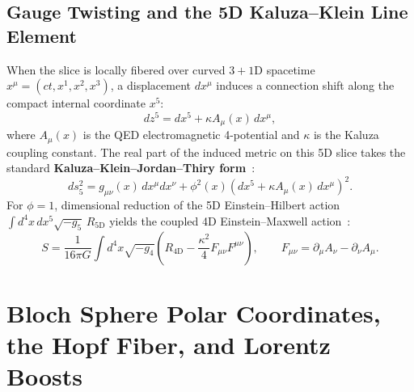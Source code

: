 \documentclass[11pt,a4paper]{article}
\begin{document}
\subsection{Gauge Twisting and the 5D Kaluza--Klein Line Element}
When the slice is locally fibered over curved $3+1\text{D}$ spacetime $x^\mu = (ct, x^1, x^2, x^3)$, a displacement $dx^\mu$ induces a connection shift along the compact internal coordinate $x^5$:
\begin{equation}
dz^5 = dx^5 + \kappa A_\mu(x)\, dx^\mu,
\end{equation}
where $A_\mu(x)$ is the QED electromagnetic 4-potential and $\kappa$ is the Kaluza coupling constant. The real part of the induced metric on this 5D slice takes the standard \textbf{Kaluza--Klein--Jordan--Thiry form}~\cite{Kaluza1921,Klein1926,Thiry1948}:
\begin{equation}
ds_5^2 = g_{\mu\nu}(x)\, dx^\mu dx^\nu + \phi^2(x)\left( dx^5 + \kappa A_\mu(x)\, dx^\mu \right)^2.
\end{equation}
For $\phi = 1$, dimensional reduction of the 5D Einstein--Hilbert action $\int d^4x\, dx^5 \sqrt{-g_5}\, R_{5\text{D}}$ yields the coupled 4D Einstein--Maxwell action~\cite{Kaluza1921,Klein1926}:
\begin{equation}
S = \frac{1}{16\pi G} \int d^4x \sqrt{-g_4} \left( R_{4\text{D}} - \frac{\kappa^2}{4} F_{\mu\nu}F^{\mu\nu} \right), \qquad F_{\mu\nu} = \partial_\mu A_\nu - \partial_\nu A_\mu.
\end{equation}

\section{Bloch Sphere Polar Coordinates, the Hopf Fiber, and Lorentz Boosts}
\end{document}
